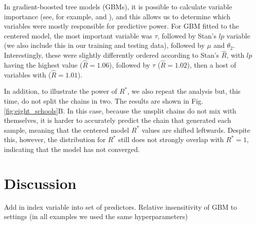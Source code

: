 \documentclass{article}
\begin{document}
In gradient-boosted tree models (GBMs), it is possible to calculate variable importance (see, for example, \cite{friedman2001greedy} and \cite{greenwell2019package}), and this allows us to determine which variables were mostly responsible for predictive power. For GBM fitted to the centered model, the most important variable was $\tau$, followed by Stan's $lp$ variable (we also include this in our training and testing data), followed by $\mu$ and $\theta_2$. Interestingly, these were slightly differently ordered according to Stan's $\hat{R}$, with $lp$ having the highest value ($\hat R = 1.06$), followed by $\tau$ ($\hat R = 1.02$), then a host of variables with ($\hat R = 1.01$).

In addition, to illustrate the power of $R^*$, we also repeat the analysis but, this time, do not split the chains in two. The results are shown in Fig.\ref{fig:eight_schools}B. In this case, because the unsplit chains do not mix with themselves, it is harder to accurately predict the chain that generated each sample, meaning that the centered model $R^*$ values are shifted leftwards. Despite this, however, the distribution for $R^*$ still does not strongly overlap with $R^*=1$, indicating that the model has not converged.


\section{Discussion}
Add in index variable into set of predictors.
Relative insensitivity of GBM to settings (in all examples we used the same hyperparameters)



	

 
	
\end{document}
